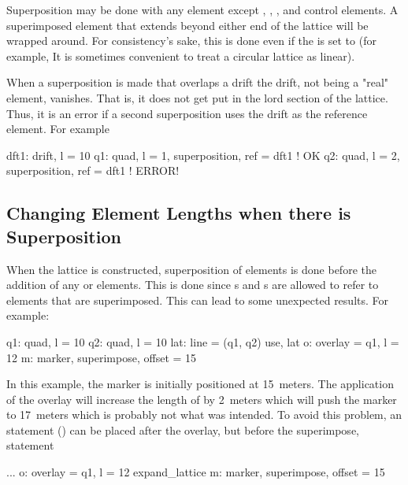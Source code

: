 Superposition may be done with any element except ,
, , and  control elements. A
superimposed element that extends beyond either end of the lattice will
be wrapped around. For consistency's sake, this is done even if the
 is set to  (for example, It is sometimes
convenient to treat a circular lattice as linear).

When a superposition is made that overlaps a drift the drift, not being a "real" 
element, vanishes. That is, it does not get put in the lord section of the lattice.
Thus, it is an error if a second superposition uses the drift as the reference element.
For example
\begin{example}
  dft1: drift, l = 10
  q1: quad, l = 1, superposition, ref = dft1   ! OK 
  q2: quad, l = 2, superposition, ref = dft1   ! ERROR! 
\end{example}

\subsection{Changing Element Lengths when there is Superposition}
\label{s:super.length}

When the lattice is constructed, superposition of elements is done
before the addition of any  or  elements. This
is done since s and s are allowed to refer
to elements that are superimposed. This can lead to some unexpected
results. For example:
\begin{example}
  q1: quad, l = 10
  q2: quad, l = 10
  lat: line = (q1, q2)
  use, lat
  o: overlay = {q1}, l = 12
  m: marker, superimpose, offset = 15
\end{example} 
In this example, the marker is initially positioned at 15~meters.
The application of the overlay will increase the length of  by
2~meters which will push the marker  to 17~meters which is probably 
not what was intended. To avoid this problem, an  statement
() can be placed after the overlay, but before the
superimpose, statement
\begin{example}
  ...
  o: overlay = {q1}, l = 12
  expand_lattice
  m: marker, superimpose, offset = 15
\end{example} 

